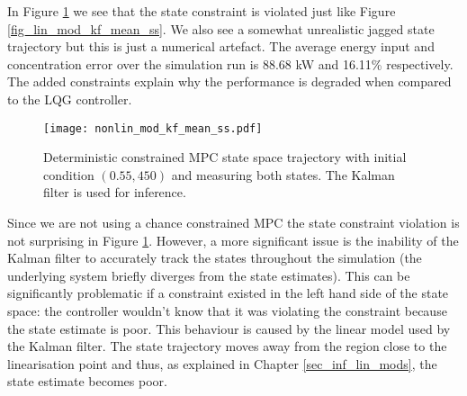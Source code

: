 In Figure \ref{fig_nonlin_mod_kf_mean_ss} we see that the state constraint is violated just like Figure \ref{fig_lin_mod_kf_mean_ss}. We also see a somewhat unrealistic jagged state trajectory but this is just a numerical artefact. The average energy input and concentration error over the simulation run is 88.68 kW and 16.11\% respectively. The added constraints explain why the performance is degraded when compared to the LQG controller.
\begin{figure}[H] 
\centering
\texttt{[image: nonlin\_mod\_kf\_mean\_ss.pdf]}
\caption{Deterministic constrained MPC state space trajectory with initial condition $(0.55, 450)$ and measuring both states. The Kalman filter is used for inference.}
\label{fig_nonlin_mod_kf_mean_ss}
\end{figure}
Since we are not using a chance constrained MPC the state constraint violation is not surprising in Figure \ref{fig_nonlin_mod_kf_mean_ss}. However, a more significant issue is the inability of the Kalman filter to accurately track the states throughout the simulation (the underlying system briefly diverges from the state estimates). This can be significantly problematic if a constraint existed in the left hand side of the state space: the controller wouldn't know that it was violating the constraint because the state estimate is poor. This behaviour is caused by the linear model used by the Kalman filter. The state trajectory moves away from the region close to the linearisation point and thus, as explained in Chapter \ref{sec_inf_lin_mods}, the state estimate becomes poor.

